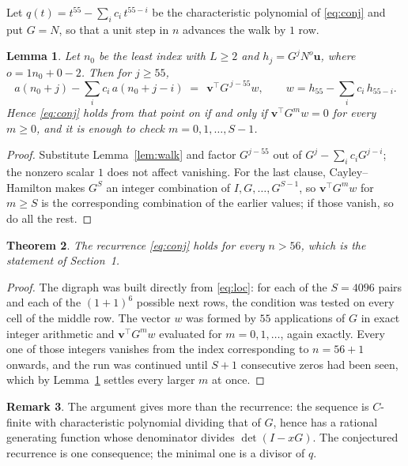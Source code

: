 \documentclass[11pt,a4paper]{article}
\theoremstyle{plain}
\newtheorem{theorem}{Theorem}
\newtheorem{lemma}[theorem]{Lemma}
\theoremstyle{definition}
\newtheorem{remark}[theorem]{Remark}
\begin{document}
Let $q(t)=t^{55}-\sum_i c_i\,t^{55-i}$ be the characteristic polynomial of
\eqref{eq:conj} and put $G=N$, so that a unit step in $n$ advances the walk by
$1$ row.

\begin{lemma}\label{lem:crit}
Let $n_0$ be the least index with $L\ge2$ and $h_j=G^{j}N^{o}\mathbf{u}$, where
$o=1n_0+0-2$. Then for $j\ge55$,
\[
a(n_0+j)-\sum_i c_i\,a(n_0+j-i)\;=\;\,\mathbf{v}^{\!\top}G^{\,j-55}w,
\qquad w=h_{55}-\sum_i c_i\,h_{55-i} .
\]
Hence \eqref{eq:conj} holds from that point on if and only if
$\mathbf{v}^{\!\top}G^{m}w=0$ for every $m\ge0$, and it is enough to check
$m=0,1,\dots,S-1$.
\end{lemma}

\begin{proof}
Substitute Lemma~\ref{lem:walk} and factor $G^{j-55}$ out of
$G^{j}-\sum_ic_iG^{j-i}$; the nonzero scalar $1$ does not affect
vanishing. For the last clause, Cayley--Hamilton makes $G^{S}$ an integer combination of
$I,G,\dots,G^{S-1}$, so $\mathbf{v}^{\!\top}G^{m}w$ for $m\ge S$ is the corresponding
combination of the earlier values; if those vanish, so do all the rest.
\end{proof}

\begin{theorem}
The recurrence \eqref{eq:conj} holds for every $n>56$, which is the statement of
Section~1.
\end{theorem}

\begin{proof}
The digraph was built directly from \eqref{eq:loc}: for each of the $S=4096$ pairs and each
of the $(1+1)^{6}$ possible next rows, the condition was tested on every cell of
the middle row. The vector $w$ was formed by $55$ applications of $G$ in exact integer
arithmetic and $\mathbf{v}^{\!\top}G^{m}w$ evaluated for $m=0,1,\dots$, again exactly.
Every one of those integers vanishes from the index corresponding to $n=56+1$ onwards,
and the run was continued until $S+1$ consecutive zeros had been seen, which by
Lemma~\ref{lem:crit} settles every larger $m$ at once.
\end{proof}

\begin{remark}
The argument gives more than the recurrence: the sequence is $C$-finite with characteristic
polynomial dividing that of $G$, hence has a rational generating function whose denominator
divides $\det(I-xG)$. The conjectured recurrence is one consequence; the minimal one is a
divisor of $q$.
\end{remark}
\end{document}
